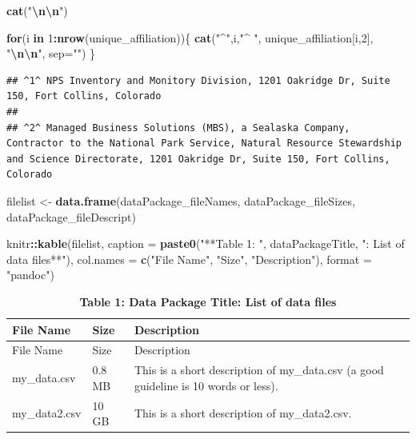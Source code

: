 \documentclass[
]{article}
\newenvironment{Shaded}{\begin{snugshade}}{\end{snugshade}}
\newcommand{\AttributeTok}[1]{\textcolor[rgb]{0.13,0.29,0.53}{#1}}
\newcommand{\ControlFlowTok}[1]{\textcolor[rgb]{0.13,0.29,0.53}{\textbf{#1}}}
\newcommand{\DecValTok}[1]{\textcolor[rgb]{0.00,0.00,0.81}{#1}}
\newcommand{\FunctionTok}[1]{\textcolor[rgb]{0.13,0.29,0.53}{\textbf{#1}}}
\newcommand{\NormalTok}[1]{#1}
\newcommand{\OtherTok}[1]{\textcolor[rgb]{0.56,0.35,0.01}{#1}}
\newcommand{\SpecialCharTok}[1]{\textcolor[rgb]{0.81,0.36,0.00}{\textbf{#1}}}
\newcommand{\StringTok}[1]{\textcolor[rgb]{0.31,0.60,0.02}{#1}}
\begin{document}
\begin{Shaded}
\begin{Highlighting}[]
\FunctionTok{cat}\NormalTok{(}\StringTok{"}\SpecialCharTok{\textbackslash{}n\textbackslash{}n}\StringTok{"}\NormalTok{)}
\end{Highlighting}
\end{Shaded}

\begin{Shaded}
\begin{Highlighting}[]
\ControlFlowTok{for}\NormalTok{(i }\ControlFlowTok{in} \DecValTok{1}\SpecialCharTok{:}\FunctionTok{nrow}\NormalTok{(unique\_affiliation))\{}
  \FunctionTok{cat}\NormalTok{(}\StringTok{"\^{}"}\NormalTok{,i,}\StringTok{"\^{} "}\NormalTok{, unique\_affiliation[i,}\DecValTok{2}\NormalTok{], }\StringTok{"}\SpecialCharTok{\textbackslash{}n\textbackslash{}n}\StringTok{"}\NormalTok{, }\AttributeTok{sep=}\StringTok{""}\NormalTok{)}
\NormalTok{  \}}
\end{Highlighting}
\end{Shaded}

\begin{verbatim}
## ^1^ NPS Inventory and Monitory Division, 1201 Oakridge Dr, Suite 150, Fort Collins, Colorado
## 
## ^2^ Managed Business Solutions (MBS), a Sealaska Company, Contractor to the National Park Service, Natural Resource Stewardship and Science Directorate, 1201 Oakridge Dr, Suite 150, Fort Collins, Colorado
\end{verbatim}

\begin{Shaded}
\begin{Highlighting}[]
\NormalTok{filelist }\OtherTok{\textless{}{-}} \FunctionTok{data.frame}\NormalTok{(dataPackage\_fileNames, dataPackage\_fileSizes, dataPackage\_fileDescript)}

\NormalTok{knitr}\SpecialCharTok{::}\FunctionTok{kable}\NormalTok{(filelist, }\AttributeTok{caption =} \FunctionTok{paste0}\NormalTok{(}\StringTok{"**Table 1: "}\NormalTok{, dataPackageTitle, }\StringTok{": List of data files**"}\NormalTok{), }\AttributeTok{col.names =} \FunctionTok{c}\NormalTok{(}\StringTok{"File Name"}\NormalTok{, }\StringTok{"Size"}\NormalTok{, }\StringTok{"Description"}\NormalTok{), }\AttributeTok{format =} \StringTok{"pandoc"}\NormalTok{)}
\end{Highlighting}
\end{Shaded}

\begin{longtable}[]{@{}lll@{}}
\caption{\textbf{Table 1: Data Package Title: List of data
files}}\tabularnewline
\toprule\noalign{}
File Name & Size & Description \\
\midrule\noalign{}
\endfirsthead
\toprule\noalign{}
File Name & Size & Description \\
\midrule\noalign{}
\endhead
\bottomrule\noalign{}
\endlastfoot
my\_data.csv & 0.8 MB & This is a short description of my\_data.csv (a
good guideline is 10 words or less). \\
my\_data2.csv & 10 GB & This is a short description of my\_data2.csv. \\
\end{longtable}
\end{document}
